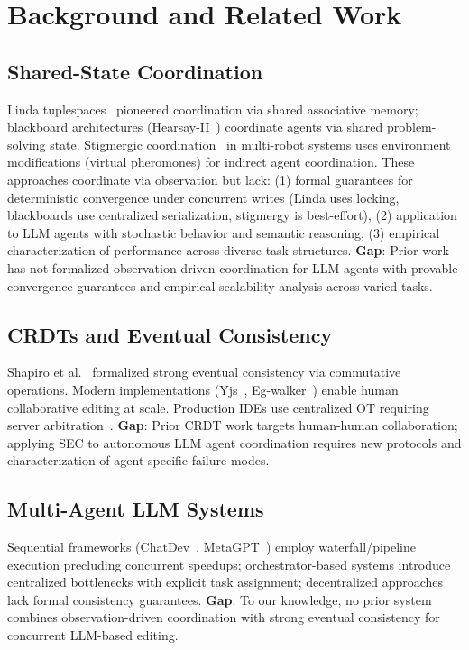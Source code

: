 \documentclass{article}
\begin{document}
\section{Background and Related Work}
\label{sec:background}

\subsection{Shared-State Coordination}

Linda tuplespaces~\cite{gelernter1985linda} pioneered coordination via shared associative memory; blackboard architectures (Hearsay-II~\cite{erman1980hearsay}) coordinate agents via shared problem-solving state. Stigmergic coordination~\cite{theraulaz1999stigmergy} in multi-robot systems uses environment modifications (virtual pheromones) for indirect agent coordination. These approaches coordinate via observation but lack: (1) formal guarantees for deterministic convergence under concurrent writes (Linda uses locking, blackboards use centralized serialization, stigmergy is best-effort), (2) application to LLM agents with stochastic behavior and semantic reasoning, (3) empirical characterization of performance across diverse task structures. \textbf{Gap}: Prior work has not formalized observation-driven coordination for LLM agents with provable convergence guarantees and empirical scalability analysis across varied tasks.

\subsection{CRDTs and Eventual Consistency}

Shapiro et al.~\cite{shapiro2011crdts} formalized strong eventual consistency via commutative operations. Modern implementations (Yjs~\cite{yjs}, Eg-walker~\cite{gentle2025egwalker}) enable human collaborative editing at scale. Production IDEs use centralized OT requiring server arbitration~\cite{vscode2020liveshare}. \textbf{Gap}: Prior CRDT work targets human-human collaboration; applying SEC to autonomous LLM agent coordination requires new protocols and characterization of agent-specific failure modes.

\subsection{Multi-Agent LLM Systems}

Sequential frameworks (ChatDev~\cite{chen2024chatdev}, MetaGPT~\cite{hong2023metagpt}) employ waterfall/pipeline execution precluding concurrent speedups; orchestrator-based systems introduce centralized bottlenecks with explicit task assignment; decentralized approaches lack formal consistency guarantees. \textbf{Gap}: To our knowledge, no prior system combines observation-driven coordination with strong eventual consistency for concurrent LLM-based editing.
\end{document}
